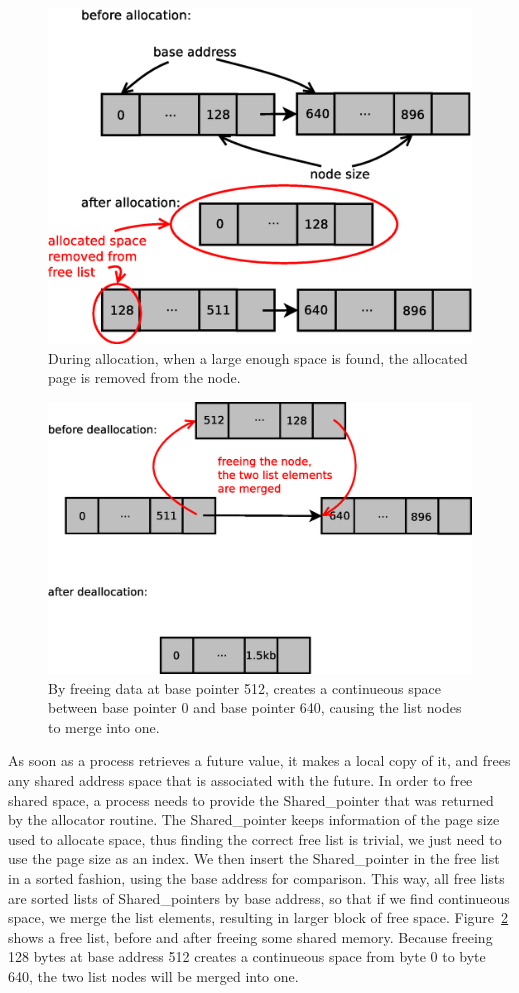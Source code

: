 \begin{figure}[here]
\includegraphics[width=0.6\columnwidth]{figures/alloc}
\caption{During allocation, when a large enough space is found, the allocated page is removed from the node.}
\label{fig:alloc}
\end{figure}

\begin{figure}[here]
\includegraphics[width=0.7\columnwidth]{figures/free}
\caption{By freeing data at base pointer 512, creates a continueous space between base pointer 0 and
base pointer 640, causing the list nodes to merge into one.}
\label{fig:free}
\end{figure}

As soon as a process retrieves a future value, it makes a local copy of it, and frees any shared address space
that is associated with the future.  In order to free shared space, a process needs to provide the Shared\_pointer
that was returned by the allocator routine.  The Shared\_pointer keeps information of the page size used to 
allocate space, thus finding the correct free list is trivial, we just need to use the page size as an index.
We then insert the Shared\_pointer in the free list in a sorted fashion, using the base address for comparison.
This way, all free lists are sorted lists of Shared\_pointers by base address, so that if we find continueous
space, we merge the list elements, resulting in larger block of free space.  Figure~\ref{fig:free} shows a 
free list, before and after freeing some shared memory.  Because freeing 128 bytes at base address 512 creates
a continueous space from byte 0 to byte 640, the two list nodes will be merged into one.

